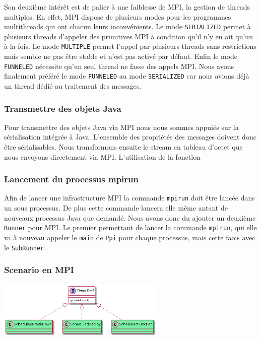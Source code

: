 \documentclass{article}
\begin{document}
				Son deuxième intérêt est de palier à une faiblesse de MPI, la gestion de threads
				multiples. En effet, MPI dispose de plusieurs modes pour les programmes
				multithreads qui ont chacun leurs inconvénients. Le mode \lstinline{SERIALIZED}
				permet à plusieurs threads d'appeler
				des primitives MPI à condition qu'il n'y en ait qu'un à la fois. Le mode
				\lstinline{MULTIPLE} permet l'appel par plusieurs threads sans restrictions mais
				semble ne pas être stable et n'est pas activé par défaut. Enfin le mode
				\lstinline{FUNNELED} nécessite qu'un seul thread ne fasse des appels MPI.
				Nous avons finalement préféré le mode \lstinline{FUNNELED} au mode
				\lstinline{SERIALIZED} car nous avions déjà un thread dédié au traitement des
				messages.

				\subsubsection{Transmettre des objets Java}
				Pour transmettre des objets Java via MPI nous nous sommes appuiés sur la sérialisation
				intégrée à Java. L'ensemble des propriétés des messages doivent donc être sérialisables.
				Nous transformons ensuite le stream en tableau d'octet que nous envoyons directement
				via MPI. L'utilisation de la fonction \lstinline{}

				\subsubsection{Lancement du processus mpirun}
				Afin de lancer une infrastructure MPI la commande \lstinline{mpirun} doit être lancée
				dans un sous processus. De plus cette commande lancera elle même antant de nouveaux
				processus Java que demandé. Nous avons donc du ajouter un deuxième \lstinline{Runner}
				pour MPI. Le premier permettant de lancer la commande \lstinline{mpirun}, qui elle
				va à nouveau appeler le \lstinline{main} de \lstinline{Ppi} pour chaque processus,
				mais cette faois avec le \lstinline{SubRunner}.

				\subsubsection{Scenario en MPI}
				\vspace{5mm}
				\hspace*{4cm} \includegraphics[width=80mm]{uml/scenMPIuml.png}
				
\end{document}
